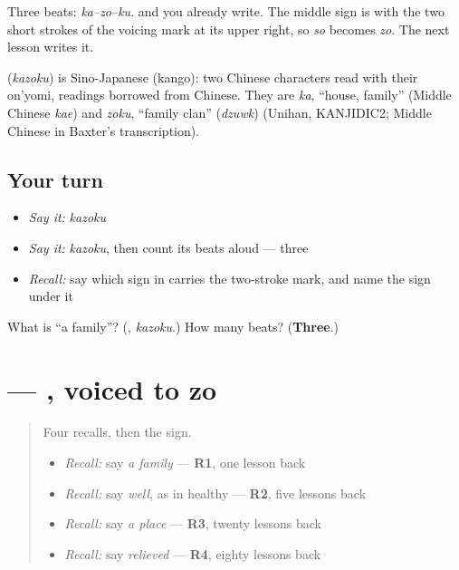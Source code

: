 Three beats: \emph{ka–zo–ku}. \textbf{} and \textbf{} you already write. The middle sign is \textbf{} with the two short strokes of the voicing mark at its upper right, so \emph{so} becomes \emph{zo}. The next lesson writes it.

\begin{cousinweb}
\textbf{} (\emph{kazoku}) is Sino-Japanese (kango): two Chinese characters read with their on'yomi, readings borrowed from Chinese. They are \emph{ka}, \textquotedblleft{}house, family\textquotedblright{} (Middle Chinese \emph{kae}) and \emph{zoku}, \textquotedblleft{}family clan\textquotedblright{} (\emph{dzuwk}) (Unihan, KANJIDIC2; Middle Chinese in Baxter's transcription).
\end{cousinweb}

\subsection*{Your turn}
\begin{itemize}
\raggedright
  \item \emph{Say it:} \emph{kazoku}
  \item \emph{Say it:} \emph{kazoku}, then count its beats aloud — three
  \item \emph{Recall:} say which sign in \textbf{} carries the two-stroke mark, and name the sign under it
\end{itemize}

\begin{tcolorbox}[breakable,colback=teal!4,colframe=teal!35!black,title={Before you move on}]
What is \textquotedblleft{}a family\textquotedblright{}? (\textbf{}, \emph{kazoku}.) How many beats? (\textbf{Three}.)
\end{tcolorbox}
\section[\texorpdfstring{\ja{ぞ} (zo)}{ぞ (zo)}]{ — , voiced to zo}

\label{lesson:JA-W136-zo}



\begin{quote}
Four recalls, then the sign.

\begin{itemize}
\raggedright
  \item \emph{Recall:} say \emph{a family} — \textbf{R1}, one lesson back
  \item \emph{Recall:} say \emph{well}, as in healthy — \textbf{R2}, five lessons back
  \item \emph{Recall:} say \emph{a place} — \textbf{R3}, twenty lessons back
  \item \emph{Recall:} say \emph{relieved} — \textbf{R4}, eighty lessons back
\end{itemize}
\end{quote}

